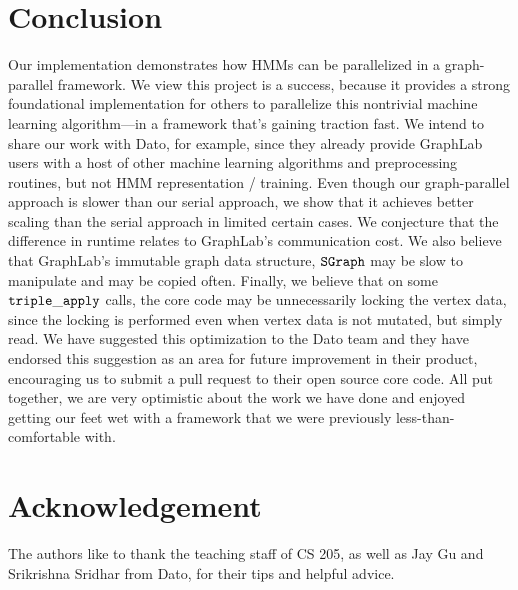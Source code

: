 \section{Conclusion}

Our implementation demonstrates how HMMs can be parallelized in a graph-parallel framework.  We view this project is a success, because it provides a strong foundational implementation for others to parallelize this nontrivial machine learning algorithm---in a framework that's gaining traction fast.   We intend to share our work with Dato, for example, since they already provide GraphLab users with a host of other machine learning algorithms and preprocessing routines, but not HMM representation / training.  Even though our graph-parallel approach is slower than
our serial approach, we show that it achieves better scaling than the serial
approach in limited certain cases. We conjecture that the difference in runtime relates to GraphLab's communication cost.  We also believe that GraphLab's immutable graph data structure, $\tt{SGraph}$ may be slow to manipulate and may be copied often.  Finally, we  believe that on some $\tt{triple\_apply}$ calls, the core code may be unnecessarily locking the vertex data, since the locking is performed even when vertex data is not mutated, but simply read.   We have suggested this optimization to the Dato team and they have endorsed this suggestion as an area for future improvement in their product, encouraging us to submit a pull request to their open source core code.  All put together, we are very optimistic about the work we have done and enjoyed getting our feet wet with a framework that we were previously less-than-comfortable with.
\section*{Acknowledgement}

The authors like to thank the teaching staff of CS 205, as well as Jay Gu and
Srikrishna Sridhar from Dato, for their tips and helpful advice.
